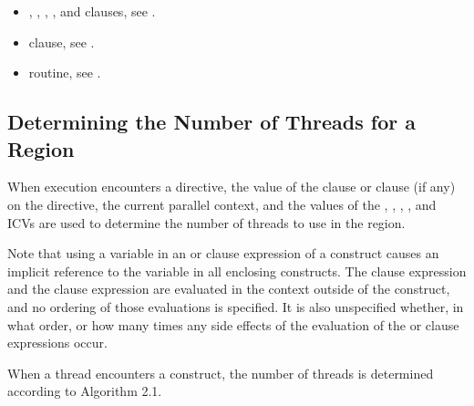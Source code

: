 \crossreferences
\begin{itemize}
\item {}, , , , and  clauses, see 
.

\item {} clause, see 
.

\item {} routine, see 
.
\end{itemize}











\subsection{Determining the Number of Threads for a  Region}
\label{subsec:Determining the Number of Threads for a parallel Region}
When execution encounters a  directive, the value of the  clause or 
 clause (if any) on the directive, the current parallel context, and the 
values of the , , , 
, and  
ICVs are used to determine the number of threads to use in the region.

Note that using a variable in an  or  clause expression of a 
 construct causes an implicit reference to the variable in all enclosing 
constructs. The  clause expression and the  clause expression are 
evaluated in the context outside of the  construct, and no ordering of those 
evaluations is specified. It is also unspecified whether, in what order, or how many times 
any side effects of the evaluation of the  or  clause expressions occur.

When a thread encounters a  construct, the number of threads is determined 
according to Algorithm 2.1.

